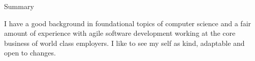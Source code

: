 \documentclass{resume}
\begin{document}
    \begin{rSection}{Summary}

        I have a good background in foundational topics of computer science
        and a fair amount of experience with agile software development working at the core business of world class employers.
        I like to see my self as kind, adaptable and open to changes.



    \end{rSection}
\end{document}
